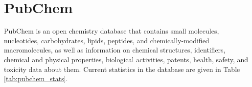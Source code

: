 \section{PubChem}
PubChem \cite{kim2021pubchem} is an open chemistry database that contains small molecules, nucleotides, carbohydrates, lipids, peptides, and chemically-modified macromolecules, as well as information on chemical structures, identifiers, chemical and physical properties, biological activities, patents, health, safety, and toxicity data about them. Current statistics in the database are given in Table \ref{tab:pubchem_stats}.



 